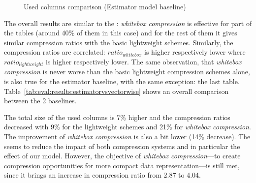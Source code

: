 \begin{figure}[h]
  \centering
  \caption{Used columns comparison (Estimator model baseline)}
  \label{fig:eval:results:estimator:used}
\end{figure}

The overall results are similar to the : \textit{whitebox compression} is effective for part of the tables (around 40\% of them in this case) and for the rest of them it gives similar compression ratios with the basic lightweight schemes. Similarly, the compression ratios are correlated: \(ratio_{whitebox}\) is higher respectively lower where \(ratio_{lightweight}\) is higher respectively lower. The same observation, that \textit{whitebox compression} is never worse than the basic lightweight compression schemes alone, is also true for the estimator baseline, with the same exception: the last table. Table~\ref{tab:eval:results:estimatorvsvectorwise} shows an overall comparison between the 2 baselines.



The total size of the used columns is 7\% higher and the compression ratios decreased with 9\% for the lightweight schemes and 21\% for \textit{whitebox compression}. The improvement of \textit{whitebox compression} is also a bit lower (14\% decrease). The  seems to reduce the impact of both compression systems and in particular the effect of our model. However, the objective of \textit{whitebox compression}---to create compression opportunities for more compact data representation---is still met, since it brings an increase in compression ratio from 2.87 to 4.04.

